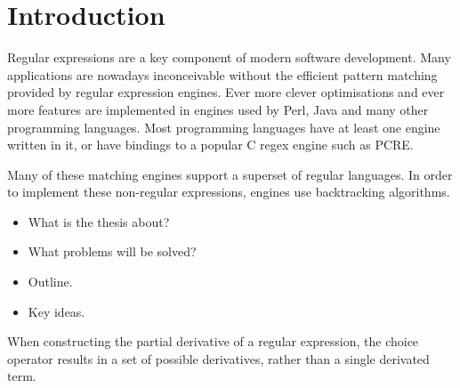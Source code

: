 \chapter{Introduction}

Regular expressions are a key component of modern software development. Many
applications are nowadays inconceivable without the efficient pattern matching
provided by regular expression engines. Ever more clever optimisations and ever
more features are implemented in engines used by Perl, Java and many other
programming languages. Most programming languages have at least one engine
written in it, or have bindings to a popular C regex engine such as PCRE.

Many of these matching engines support a superset of regular languages. In order
to implement these non-regular expressions, engines use backtracking algorithms.

\begin{itemize}
   \item What is the thesis about?
   \item What problems will be solved?
   \item Outline.
   \item Key ideas.
\end{itemize}

When constructing the partial derivative of a regular expression, the choice
operator results in a set of possible derivatives, rather than a single
derivated term.


